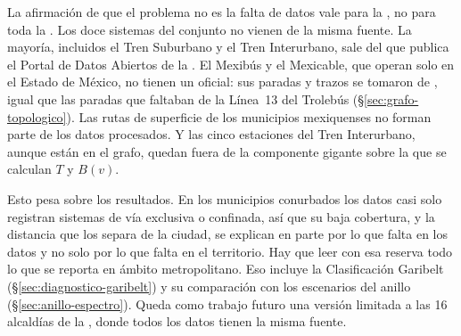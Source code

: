 La afirmación de que el problema no es la falta de datos vale para la \cdmx{},
no para toda la \zmvm{}. Los doce sistemas del conjunto no vienen de la misma
fuente. La mayoría, incluidos el Tren Suburbano y el Tren Interurbano, sale del
\gtfs{} que publica el Portal de Datos Abiertos de la \cdmx{}
\citep{adip_gtfs_2024}. El Mexibús y el Mexicable, que operan solo en el Estado
de México, no tienen un \gtfs{} oficial: sus paradas y trazos se tomaron de
 \citep{osm2012}, igual que las paradas que faltaban de
la Línea~13 del Trolebús (§\ref{sec:grafo-topologico}). Las rutas de superficie
de los municipios mexiquenses no forman parte de los datos procesados. Y las
cinco estaciones del Tren Interurbano, aunque están en el grafo, quedan fuera de
la componente gigante sobre la que se calculan $T$ y $B(v)$.

Esto pesa sobre los resultados. En los municipios conurbados los datos casi
solo registran sistemas de vía exclusiva o confinada, así que su baja cobertura,
y la distancia que los separa de la ciudad, se explican en parte por lo que falta
en los datos y no solo por lo que falta en el territorio. Hay que leer con esa
reserva todo lo que se reporta en ámbito metropolitano. Eso incluye la
Clasificación Garibelt (§\ref{sec:diagnostico-garibelt}) y su comparación con
los escenarios del anillo (§\ref{sec:anillo-espectro}). Queda como trabajo
futuro una versión limitada a las 16 alcaldías de la \cdmx{}, donde todos los
datos tienen la misma fuente.
